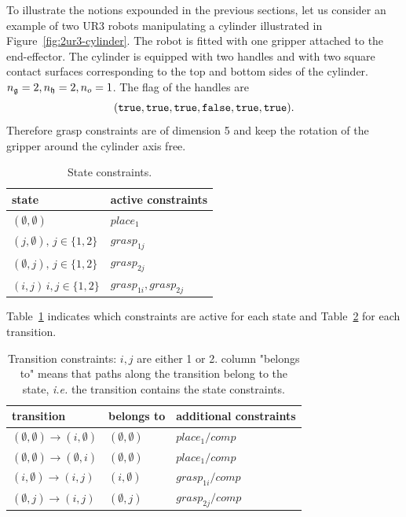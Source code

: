 To illustrate the notions expounded in the previous sections, let us consider an example of two UR3 robots manipulating a cylinder illustrated in Figure~\ref{fig:2ur3-cylinder}. The robot is fitted with one gripper attached to the end-effector. The cylinder is equipped with two handles and with two square contact surfaces corresponding to the top and bottom sides of the cylinder. $n_{\mathfrak{g}}=2,n_{\mathfrak{h}}=2,n_{o}=1$. The flag of the handles are
$$(\texttt{true},\texttt{true},\texttt{true},\texttt{false},\texttt{true},\texttt{true}).$$
Therefore grasp constraints are of dimension 5 and keep the rotation of the gripper around the cylinder axis free.
\begin{table}
  \begin{center}
    \begin{tabular}{|p{.44\linewidth}|p{.44\linewidth}|}
      \hline
      state & active constraints\\
      \hline
      $(\emptyset,\emptyset)$ & $place_1$ \\
      $(j,\emptyset),\,j\in\{1,2\}$ & $grasp_{1j}$\\
      $(\emptyset,j),\,j\in\{1,2\}$ & $grasp_{2j}$\\
      $(i,j)\,i,j\in\{1,2\}$ & $grasp_{1i},grasp_{2j}$\\
      \hline
    \end{tabular}
  \end{center}
  \caption{State constraints.}
  \label{tab:state-constraints}
\end{table}
Table~\ref{tab:state-constraints} indicates which constraints are active for each state and Table~\ref{tab:transition-constraints} for each transition.

\begin{table}
  \begin{center}
    \begin{tabular}{|p{.25\linewidth}|p{.18\linewidth}|p{.41\linewidth}|}
      \hline
      transition & belongs to & additional constraints\\
      \hline
      $(\emptyset,\emptyset)\rightarrow (i,\emptyset)$ & $(\emptyset,\emptyset)$ & $place_1/comp$\\
      $(\emptyset,\emptyset)\rightarrow (\emptyset,i)$ & $(\emptyset,\emptyset)$ & $place_1/comp$\\
      $(i,\emptyset)\rightarrow(i,j)$ & $(i,\emptyset)$ & $grasp_{1i}/comp$\\
      $(\emptyset,j)\rightarrow(i,j)$ & $(\emptyset,j)$ & $grasp_{2j}/comp$\\
      \hline
    \end{tabular}
  \end{center}
  \caption{Transition constraints: $i,j$ are either 1 or 2. column
    "belongs to" means that paths along the transition belong to the
    state, \textit{i.e.} the transition contains the state
    constraints.}
  \label{tab:transition-constraints}
\end{table}

